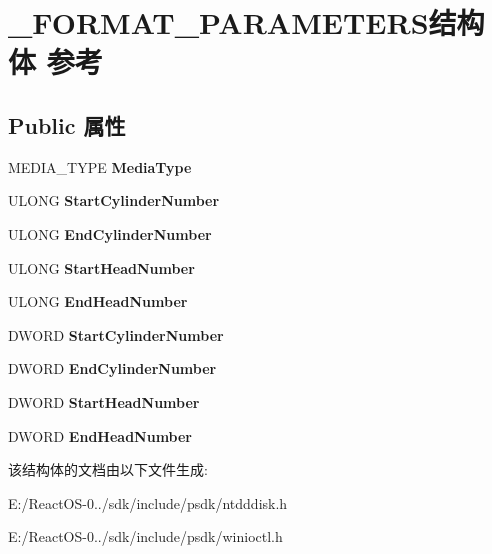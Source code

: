 \hypertarget{struct___f_o_r_m_a_t___p_a_r_a_m_e_t_e_r_s}{}\section{\+\_\+\+F\+O\+R\+M\+A\+T\+\_\+\+P\+A\+R\+A\+M\+E\+T\+E\+R\+S结构体 参考}
\label{struct___f_o_r_m_a_t___p_a_r_a_m_e_t_e_r_s}
\subsection*{Public 属性}
\begin{DoxyCompactItemize}
\item 
\mbox{\label{struct___f_o_r_m_a_t___p_a_r_a_m_e_t_e_r_s_a1c5b0a007047dc7a15a64c1a29c33e2b}} 
M\+E\+D\+I\+A\+\_\+\+T\+Y\+PE {\bfseries Media\+Type}
\item 
\mbox{\label{struct___f_o_r_m_a_t___p_a_r_a_m_e_t_e_r_s_af01253ff353841feeec940bc61cd6420}} 
U\+L\+O\+NG {\bfseries Start\+Cylinder\+Number}
\item 
\mbox{\label{struct___f_o_r_m_a_t___p_a_r_a_m_e_t_e_r_s_ab1c9fd7a8c18e75e1a414623ef4fee39}} 
U\+L\+O\+NG {\bfseries End\+Cylinder\+Number}
\item 
\mbox{\label{struct___f_o_r_m_a_t___p_a_r_a_m_e_t_e_r_s_ae53f509c45d855b6153af01fe13a2efb}} 
U\+L\+O\+NG {\bfseries Start\+Head\+Number}
\item 
\mbox{\label{struct___f_o_r_m_a_t___p_a_r_a_m_e_t_e_r_s_a63fe660194867ef99a309c1dd0f0550c}} 
U\+L\+O\+NG {\bfseries End\+Head\+Number}
\item 
\mbox{\label{struct___f_o_r_m_a_t___p_a_r_a_m_e_t_e_r_s_af01253ff353841feeec940bc61cd6420}} 
D\+W\+O\+RD {\bfseries Start\+Cylinder\+Number}
\item 
\mbox{\label{struct___f_o_r_m_a_t___p_a_r_a_m_e_t_e_r_s_ab1c9fd7a8c18e75e1a414623ef4fee39}} 
D\+W\+O\+RD {\bfseries End\+Cylinder\+Number}
\item 
\mbox{\label{struct___f_o_r_m_a_t___p_a_r_a_m_e_t_e_r_s_ae53f509c45d855b6153af01fe13a2efb}} 
D\+W\+O\+RD {\bfseries Start\+Head\+Number}
\item 
\mbox{\label{struct___f_o_r_m_a_t___p_a_r_a_m_e_t_e_r_s_a63fe660194867ef99a309c1dd0f0550c}} 
D\+W\+O\+RD {\bfseries End\+Head\+Number}
\end{DoxyCompactItemize}


该结构体的文档由以下文件生成\+:\begin{DoxyCompactItemize}
\item 
E\+:/\+React\+O\+S-\/0../sdk/include/psdk/ntdddisk.\+h\item 
E\+:/\+React\+O\+S-\/0../sdk/include/psdk/winioctl.\+h\end{DoxyCompactItemize}
